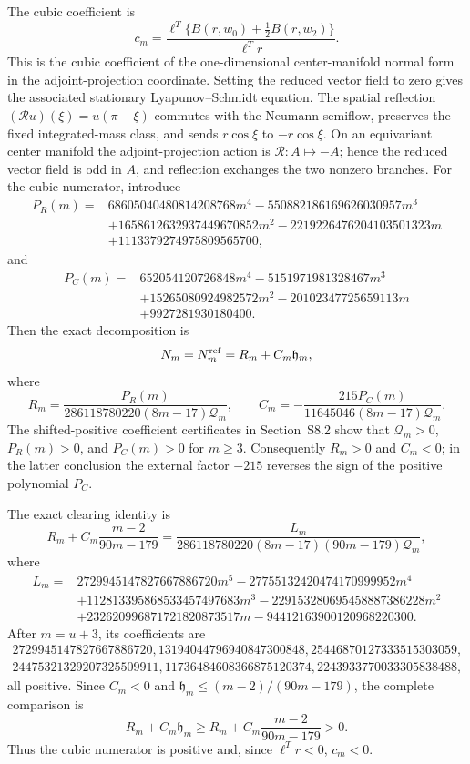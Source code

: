 \documentclass[10pt]{article}
\newcommand{\1}{\mathbf1}
\begin{document}
The cubic coefficient is
\[
 c_m=\frac{\ell^T\{B(r,w_0)+\tfrac12B(r,w_2)\}}{\ell^Tr}.
\]
This is the cubic coefficient of the one-dimensional center-manifold normal
form in the adjoint-projection coordinate.  Setting the reduced vector field
to zero gives the associated stationary Lyapunov--Schmidt equation.  The
spatial reflection $(\mathcal Ru)(\xi)=u(\pi-\xi)$ commutes with the Neumann
semiflow, preserves the fixed integrated-mass class, and sends
$r\cos\xi$ to $-r\cos\xi$.  On an equivariant center manifold the
adjoint-projection action is $\mathcal R:A\mapsto-A$; hence the reduced vector
field is odd in $A$, and reflection exchanges the two nonzero branches.
For the cubic numerator, introduce
\begin{align*}
 P_R(m)={}&68605040480814208768m^4
 -550882186169626030957m^3\\
 &+1658612632937449670852m^2
 -2219226476204103501323m\\
 &+1113379274975809565700,
\end{align*}
and
\begin{align*}
 P_C(m)={}&652054120726848m^4
 -5151971981328467m^3\\
 &+15265080924982572m^2
 -20102347725659113m\\
 &+9927281930180400.
\end{align*}
Then the exact decomposition is
\[
 N_m=N_m^{\rm ref}=R_m+C_m\mathfrak h_m,
\]
where
\[
 R_m=\frac{P_R(m)}
 {286118780220(8m-17)\mathcal Q_m},
 \qquad
 C_m=-\frac{215P_C(m)}
 {11645046(8m-17)\mathcal Q_m}.
\]
The shifted-positive coefficient certificates in Section~S8.2 show that
$\mathcal Q_m>0$, $P_R(m)>0$, and $P_C(m)>0$ for $m\ge3$.
Consequently $R_m>0$ and $C_m<0$; in the latter conclusion the external
factor $-215$ reverses the sign of the positive polynomial $P_C$.

The exact clearing identity is
\[
 R_m+C_m\frac{m-2}{90m-179}
 =\frac{L_m}
 {286118780220(8m-17)(90m-179)\mathcal Q_m},
\]
where
\begin{align*}
L_m={}&2729945147827667886720m^5
-27755132420474170999952m^4\\
&+112813395868533457497683m^3
-229153280695458887386228m^2\\
&+232620996871721820873517m
-94412163900120968220300.
\tag{S6.1}\label{eq:Lmpoly}
\end{align*}
After $m=u+3$, its coefficients are
\begin{gather*}
2729945147827667886720,
13194044796940847300848,
25446870127333515303059,\\
24475321329207325509911,
11736484608366875120374,
2243933770033305838488,
\end{gather*}
all positive.  Since $C_m<0$ and
$\mathfrak h_m\le(m-2)/(90m-179)$, the complete comparison is
\[
 R_m+C_m\mathfrak h_m
 \ge R_m+C_m\frac{m-2}{90m-179}>0.
\]
Thus the cubic numerator is positive and, since $\ell^Tr<0$, $c_m<0$.
\end{document}
